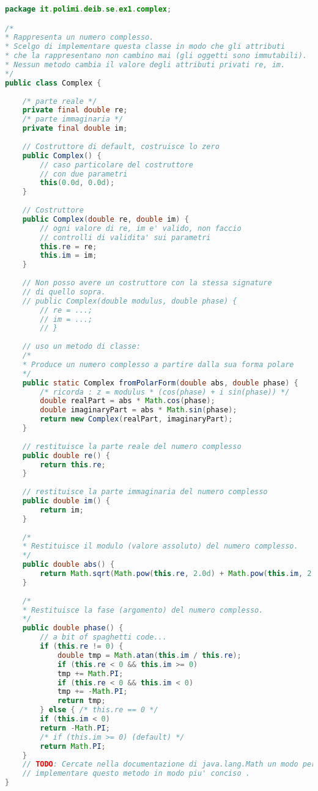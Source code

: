 \documentclass{article}
\begin{document}
\begin{lstlisting}[language=Java,escapechar=|]
package it.polimi.deib.se.ex1.complex;

/*
* Rappresenta un numero complesso.
* Scelgo di implementare questa classe in modo che gli attributi
* che la rappresentano non cambino mai (gli oggetti sono immutabili).
* Nessun metodo cambia il valore degli attributi privati re, im.
*/
public class Complex {
	
	/* parte reale */
	private final double re;
	/* parte immaginaria */
	private final double im;
	
	// Costruttore di default, costruisce lo zero
	public Complex() {
		// caso particolare del costruttore
		// con due parametri
		this(0.0d, 0.0d);
	}
	
	// Costruttore
	public Complex(double re, double im) {
		// ogni valore di re, im e' valido, non faccio
		// controlli di validita' sui parametri
		this.re = re;
		this.im = im;
	}
	
	// Non posso avere un costruttore con la stessa signature
	// di quello sopra.
	// public Complex(double modulus, double phase) {
		// re = ...;
		// im = ...;
		// }
	
	// uso un metodo di classe:
	/*
	* Produce un numero complesso a partire dalla sua forma polare
	*/
	public static Complex fromPolarForm(double abs, double phase) {
		/* ricorda : z = modulus * (cos(phase) + i sin(phase)) */
		double realPart = abs * Math.cos(phase);
		double imaginaryPart = abs * Math.sin(phase);
		return new Complex(realPart, imaginaryPart);
	}
	
	// restituisce la parte reale del numero complesso
	public double re() {
		return this.re;
	}
	
	// restituisce la parte immaginaria del numero complesso
	public double im() {
		return im;
	}
	
	/*
	* Restituisce il modulo (valore assoluto) del numero complesso.
	*/
	public double abs() {
		return Math.sqrt(Math.pow(this.re, 2.0d) + Math.pow(this.im, 2.0d));
	}
	
	/*
	* Restituisce la fase (argomento) del numero complesso.
	*/
	public double phase() {
		// a bit of spaghetti code...
		if (this.re != 0) {
			double tmp = Math.atan(this.im / this.re);
			if (this.re < 0 && this.im >= 0)
			tmp += Math.PI;
			if (this.re < 0 && this.im < 0)
			tmp += -Math.PI;
			return tmp;
		} else { /* this.re == 0 */
		if (this.im < 0)
		return -Math.PI;
		/* if (this.im >= 0) (default) */
		return Math.PI;
	}
	// TODO: Cercate nella documentazione di java.lang.Math un modo per
	// implementare questo metodo in modo piu' conciso .
}


\end{lstlisting}
\end{document}
